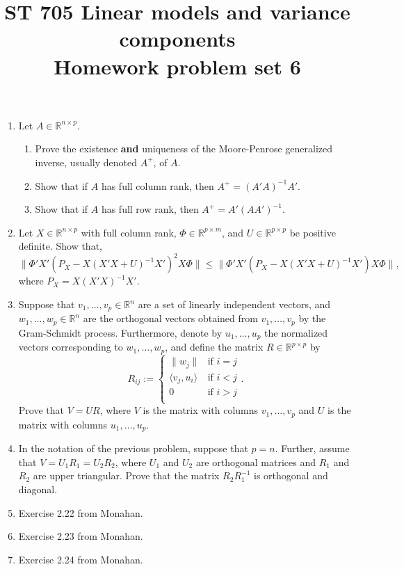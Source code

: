 \documentclass[11pt]{article}
\title{ST 705 Linear models and variance components \\ 
        Homework problem set 6}
\begin{document}
\maketitle

\begin{enumerate}

\item Let $A \in \mathbb{R}^{n\times p}$.
\begin{enumerate}
\item Prove the existence \textbf{and} uniqueness of the Moore-Penrose generalized inverse, usually denoted $A^{+}$, of $A$.
\item Show that if $A$ has full column rank, then $A^{+} = (A'A)^{-1}A'$.  
\item Show that if $A$ has full row rank, then $A^{+} = A'(AA')^{-1}$.
\end{enumerate}

\item Let $X \in \mathbb{R}^{n\times p}$ with full column rank, $\Phi \in \mathbb{R}^{p\times m}$, and $U \in \mathbb{R}^{p\times p}$ be positive definite.  Show that,
\[
\|\Phi' X'(P_{X} - X(X'X + U)^{-1}X')^{2}X\Phi\| \le \|\Phi' X'(P_{X} - X(X'X + U)^{-1}X')X\Phi\|,
\]
where $P_{X} = X(X'X)^{-1}X'$.

\item Suppose that $v_{1},\dots,v_{p} \in \mathbb{R}^{n}$ are a set of linearly independent vectors, and $w_{1},\dots,w_{p} \in \mathbb{R}^{n}$ are the orthogonal vectors obtained from $v_{1},\dots,v_{p}$ by the Gram-Schmidt process.  Furthermore, denote by $u_{1},\dots,u_{p}$ the normalized vectors corresponding to $w_{1},\dots,w_{p}$, and define the matrix $R \in \mathbb{R}^{p\times p}$ by
\[
R_{ij} :=
\begin{cases}
\|w_{j}\| & \text{if } i=j \\
\langle v_{j}, u_i\rangle & \text{if } i<j \\
0 & \text{if } i>j \\
\end{cases}.
\]
Prove that $V = UR$, where $V$ is the matrix with columns $v_{1},\dots,v_{p}$ and $U$ is the matrix with columns $u_{1},\dots,u_{p}$.

\item In the notation of the previous problem, suppose that $p = n$.  Further, assume that $V = U_{1}R_{1} = U_{2}R_{2}$, where $U_{1}$ and $U_{2}$ are orthogonal matrices and $R_{1}$ and $R_{2}$ are upper triangular.  Prove that the matrix $R_{2}R_{1}^{-1}$ is orthogonal and diagonal.

\item Exercise 2.22 from Monahan.

\item Exercise 2.23 from Monahan.

\item Exercise 2.24 from Monahan.




\end{enumerate}
\end{document}
